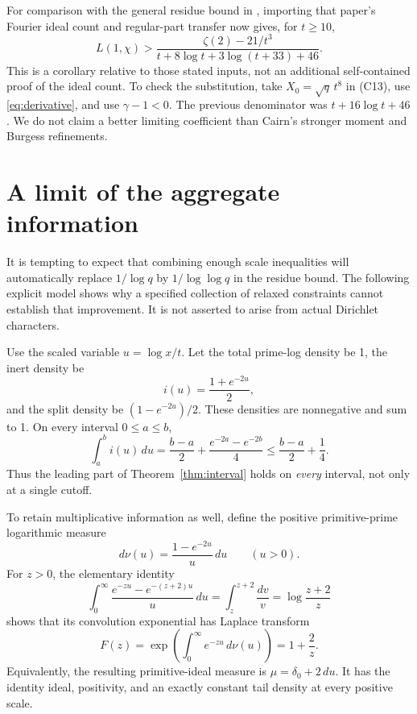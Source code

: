 \documentclass[11pt]{article}
\begin{document}
For comparison with the general residue bound in
\cite[Appendix C.4, (C13)]{cairn}, importing that paper's Fourier
ideal count and regular-part transfer now gives, for $t\ge10$,
\begin{equation}\label{eq:residue}
 L(1,\chi)>
 \frac{\zeta(2)-21/t^3}{t+8\log t+3\log(t+33)+46}.
\end{equation}
This is a corollary relative to those stated inputs, not an additional
self-contained proof of the ideal count. To check the substitution,
take $X_0=\sqrt q\,t^8$ in (C13), use \eqref{eq:derivative},
and use $\gamma-1<0$. The previous denominator was
$t+16\log t+46$. We do not claim a better limiting coefficient
than Cairn's stronger moment and Burgess refinements.

\section{A limit of the aggregate information}
It is tempting to expect that combining enough scale inequalities
will automatically replace $1/\log q$ by $1/\log\log q$ in the
residue bound. The following explicit model shows why a specified
collection of relaxed constraints cannot establish that improvement.
It is not asserted to arise from actual Dirichlet characters.

Use the scaled variable $u=\log x/t$. Let the total prime-log
density be 1, the inert density be
\[
 i(u)=\frac{1+e^{-2u}}2,
\]
and the split density be $(1-e^{-2u})/2$. These densities are
nonnegative and sum to 1. On every interval $0\le a\le b$,
\begin{equation}\label{eq:model-interval}
 \int_a^b i(u)\,du
 =\frac{b-a}{2}+\frac{e^{-2a}-e^{-2b}}4
 \le\frac{b-a}{2}+\frac14.
\end{equation}
Thus the leading part of Theorem~\ref{thm:interval} holds on
\emph{every} interval, not only at a single cutoff.

To retain multiplicative information as well, define the positive
primitive-prime logarithmic measure
\[
 d\nu(u)=\frac{1-e^{-2u}}u\,du\qquad(u>0).
\]
For $z>0$, the elementary identity
\[
 \int_0^\infty\frac{e^{-zu}-e^{-(z+2)u}}u\,du
 =\int_z^{z+2}\frac{dv}{v}=\log\frac{z+2}{z}
\]
shows that its convolution exponential has Laplace transform
\begin{equation}\label{eq:model-euler}
 F(z)=\exp\left(\int_0^\infty e^{-zu}\,d\nu(u)\right)
 =1+\frac2z.
\end{equation}
Equivalently, the resulting primitive-ideal measure is
$\mu=\delta_0+2\,du$. It has the identity ideal, positivity, and an
exactly constant tail density at every positive scale.
\end{document}

